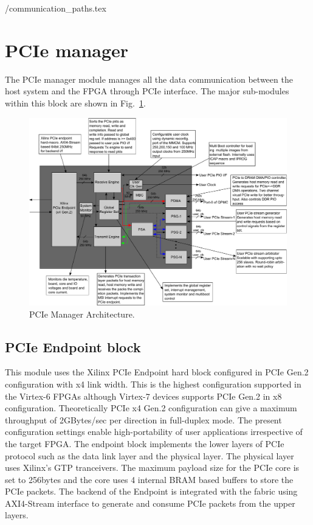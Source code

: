 \TBLDIR/communication_paths.tex

\section{PCIe manager}
The PCIe manager module manages all the data communication between the host system and the FPGA through PCIe interface.
The major sub-modules within this block are shown in Fig.~\ref{pcie_mnger}.
\begin{figure}[h]
\centering
\includegraphics[width=16cm]{figures/pcie_section.pdf}
\caption{PCIe Manager Architecture.}
\label{pcie_mnger}
\end{figure}

\subsection{PCIe Endpoint block}
This module uses the Xilinx PCIe Endpoint hard block configured in PCIe Gen.2 configuration with x4 link width.
This is the highest configuration supported in the Virtex-6 FPGAs although Virtex-7 devices supports PCIe Gen.2 in x8 configuration.
Theoretically PCIe x4 Gen.2 configuration can give a maximum throughput of 2GBytes/sec per direction in full-duplex mode.
The present configuration settings enable high-portability of user applications irrespective of the target FPGA.
The endpoint block implements the lower layers of PCIe protocol such as the data link layer and the physical layer.
The physical layer uses Xilinx's GTP tranceivers.
The maximum payload size for the PCIe core is set to 256bytes and the core uses 4 internal BRAM based buffers to store the PCIe packets.
The backend of the Endpoint is integrated with the fabric using AXI4-Stream interface to generate and consume PCIe packets from the upper layers.

